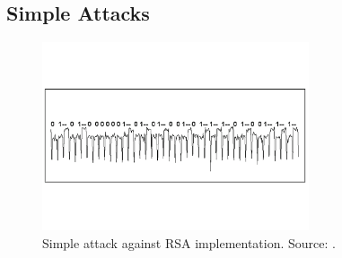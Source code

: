 \subsection{Simple Attacks}\label{sec:simple}
\begin{figure}
\centering
\includegraphics[width=0.7\textwidth]{../Figures/SPA_SM_kocher_2011.pdf} 
\caption{Simple attack against RSA implementation. Source: \cite{kocher2011introduction}.}\label{fig:SPA}
\end{figure}

